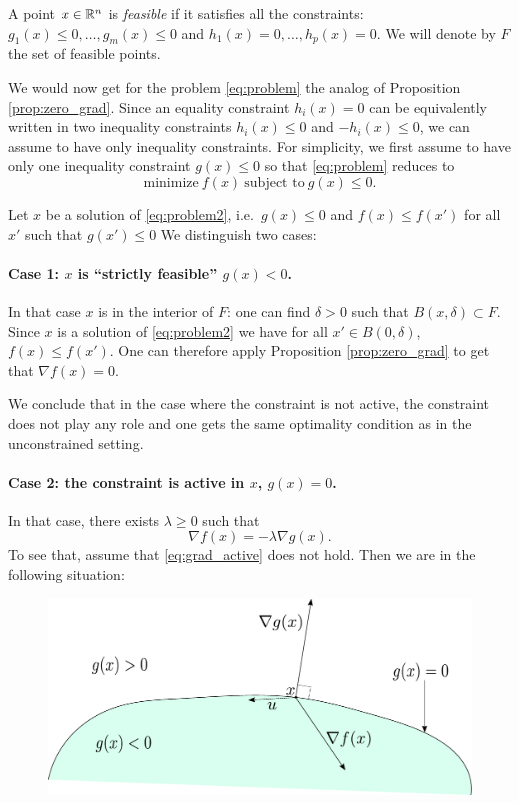 \documentclass[11pt,nocut]{article}
\begin{document}
\begin{definition}
	A point $x \in \mathbb{R}^n$ is \emph{feasible} if it satisfies all the constraints: $g_1(x) \leq 0, \dots, g_m(x)\leq  0$ and $h_1(x) = 0, \dots, h_p(x) = 0$. We will denote by $F$ the set of feasible points.
\end{definition}

We would now get for the problem \eqref{eq:problem} the analog of Proposition \ref{prop:zero_grad}.
Since an equality constraint $h_i(x) = 0$ can be equivalently written in two inequality constraints $h_i(x) \leq 0$ and $-h_i(x) \leq 0$, we can assume to have only inequality constraints.
For simplicity, we first assume to have only one inequality constraint $g(x) \leq 0$ so that \eqref{eq:problem} reduces to
\begin{equation}\label{eq:problem2}
	\text{minimize} \ f(x) \ \text{subject to} \ g(x) \leq 0.
\end{equation}


Let $x$ be a solution of \eqref{eq:problem2}, i.e.\ $g(x) \leq 0$ and $f(x) \leq f(x')$ for all $x'$ such that $g(x')\leq0$
We distinguish two cases:

\paragraph{Case 1: $x$ is ``strictly feasible'' $g(x) <0$.} In that case $x$ is in the interior of $F$: one can find $\delta > 0$ such that $B(x,\delta) \subset F$. Since $x$ is a solution of \eqref{eq:problem2} we have for all $x' \in B(0,\delta)$, $f(x) \leq f(x')$. One can therefore apply Proposition \ref{prop:zero_grad} to get that $\nabla f(x) = 0$.

We conclude that in the case where the constraint is not active, the constraint does not play any role and one gets the same optimality condition as in the unconstrained setting.

\paragraph{Case 2: the constraint is active in $x$, $g(x) = 0$.}
In that case, there exists $\lambda \geq 0$ such that 
\begin{equation}\label{eq:grad_active}
	\nabla f(x) = - \lambda \nabla g(x).
\end{equation}
To see that, assume that \eqref{eq:grad_active} does not hold. Then we are in the following situation:
\begin{figure}[h!]
	\begin{center}
		\includegraphics[width=0.8\linewidth]{figures/absurd.pdf}
	\end{center}
\end{figure}
\end{document}
